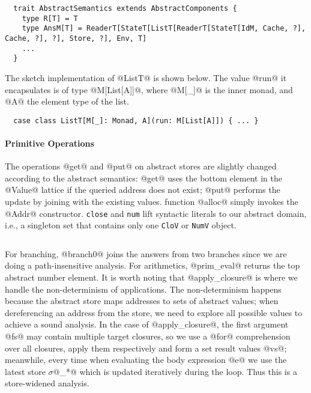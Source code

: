 \begin{lstlisting}
  trait AbstractSemantics extends AbstractComponents {
    type R[T] = T
    type AnsM[T] = ReaderT[StateT[ListT[ReaderT[StateT[IdM, Cache, ?], Cache, ?], ?], Store, ?], Env, T]
    ...
  }
\end{lstlisting}

The sketch implementation of @ListT@ is shown below. The value @run@ it encapsulates
is of type @M[List[A]]@, where @M[_]@ is the inner monad, and @A@ the element
type of the list. 

\begin{lstlisting}
  case class ListT[M[_]: Monad, A](run: M[List[A]]) { ... }
\end{lstlisting}

\paragraph{Primitive Operations} 

The operations @get@ and @put@ on abstract stores are slightly changed according
to the abstract semantics: @get@ uses the bottom element in the @Value@ lattice
if the queried address does not exist; @put@ performs the update by joining with
the existing values. function @alloc@ simply invokes the @Addr@ constructor.
\texttt{close} and \texttt{num} lift syntactic literals to our abstract domain,
i.e., a singleton set that contains only one \texttt{CloV} or \texttt{NumV}
object.

\begin{lstlisting}
\end{lstlisting}

For branching, @branch0@ joins the answers from two branches since we are doing
a path-insensitive analysis. For arithmetics, @prim_eval@ returns the top
abstract number element. It is worth noting that @apply_closure@ is where we
handle the non-determinism of applications. The non-determinism happens because
the abstract store maps addresses to sets of abstract values; when dereferencing
an address from the store, we need to explore all possible values to achieve a
sound analysis. In the case of @apply_closure@, the first argument @fs@ may
contain multiple target closures, so we use a @for@ comprehension over all
closures, apply them respectively and form a set result values @vs@; meanwhile,
every time when evaluating the body expression @e@ we use the latest store
$\sigma$@_*@ which is updated iteratively during the loop. Thus this is a
store-widened analysis.

